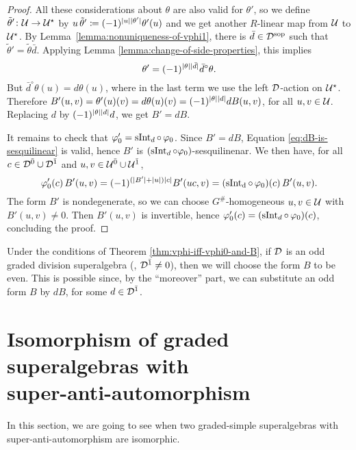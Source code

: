 \begin{proof}
    All these considerations about $\theta$ are also valid for $\theta'$, so we define $\tilde\theta'\colon \mathcal U \to \mathcal U^\star$ by $u\,\tilde\theta' \coloneqq (-1)^{|u||\theta'|} \theta'(u)$ and we get another $R$-linear map from $\mathcal U$ to $\mathcal U^\star$.
    By Lemma~\ref{lemma:nonuniqueness-of-vphi1}, there is $\bar d\in \mathcal{D}^{\mathrm{sop}}$ such that $\tilde\theta' = \tilde\theta \bar d$.
    Applying Lemma \ref{lemma:change-of-side-properties}, this implies \[\theta' = (-1)^{|\theta||\bar d|} \bar d^\circ \theta.\]
    But $\bar d^\circ \theta (u) = d\theta(u)$, where in the last term we use the left $\mathcal{D}$-action on $\mathcal U^\star$. 
    Therefore $B'(u,v) = \theta'(u)(v) = d\theta(u)(v) = (-1)^{|\theta||d|} dB(u, v)$, for all $u,v \in \mathcal U$. 
    Replacing $d$ by $(-1)^{|\theta||d|} d$, we get $B' = dB$. 
    
    It remains to check that $\varphi_0' = \operatorname{sInt}_d \circ\, \varphi_0$. 
    Since $B' = dB$, Equation \eqref{eq:dB-is-sesquilinear} is valid, hence $B'$ is $(\operatorname{sInt}_d \circ \varphi_0)$-sesquilinenar.
    We then have, for all $c\in \mathcal{D}^{\bar0} \cup \mathcal{D}^{\bar1}$ and $u,v \in \mathcal U^{\bar0} \cup \mathcal U^{\bar1}$,
    \[
        \varphi_0'(c)\, B'(u,v) = (-1)^{(|B'| + |u|) |c|} B'(uc,v) = (\operatorname{sInt_d} \circ\, \varphi_0) (c)\, B'(u,v).
    \]
    The form $B'$ is nondegenerate, so we can choose $G^\#$-homogeneous $u,v\in \mathcal U$ with $B'(u,v)\neq 0$. Then $B'(u,v)$ is invertible, hence $\varphi_0' (c) = (\operatorname{sInt}_d \circ\, \varphi_0) (c)$, concluding the proof.
\end{proof}

\begin{convention}\label{conv:pick-even-form}
    Under the conditions of Theorem \ref{thm:vphi-iff-vphi0-and-B}, if $\mathcal{D}$ is an odd graded division superalgebra (\ie, $\mathcal{D}^{\bar1} \neq 0$), then we will choose the form $B$ to be even. 
    This is possible since, by the ``moreover'' part, we can substitute an odd form $B$ by $dB$, for some $d\in \mathcal{D}^{\bar1}$.
\end{convention}

\section{Isomorphism of graded superalgebras with\\ super-anti-automorphism}

In this section, we are going to see when two graded-simple superalgebras with super-anti-automorphism are isomorphic. 

